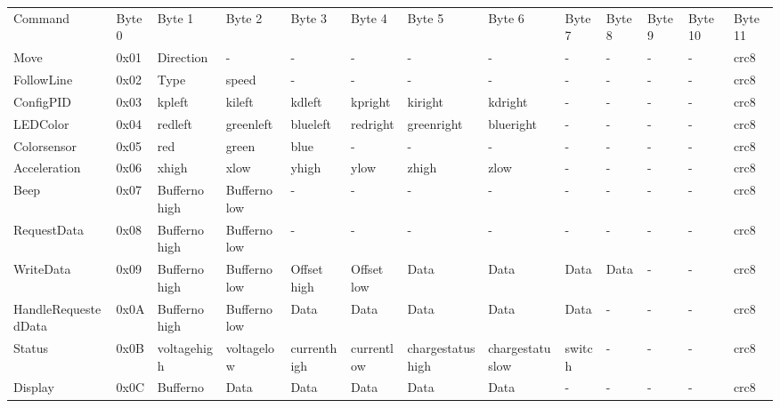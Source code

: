 \begin{landscape}
\begin{footnotesize}
\begin{tabular}{lllllllllllll}
Command &
    Byte 0 &
    Byte 1 &
    Byte 2 &
    Byte 3 &
    Byte 4 &
    Byte 5 &
    Byte 6 &
    Byte 7 &
    Byte 8 &
    Byte 9 &
    Byte 10 &
    Byte 11 \\
Move &
    0x01 &
    Direction &
    - &
    - &
    - &
    - &
    - &
    - &
    - &
    - &
    - &
    crc8 \\
FollowLine &
    0x02 &
    Type &
    speed &
    - &
    - &
    - &
    - &
    - &
    - &
    - &
    - &
    crc8 \\
ConfigPID &
    0x03 &
    kpleft &
    kileft &
    kdleft &
    kpright &
    kiright &
    kdright &
    - &
    - &
    - &
    - &
    crc8 \\
LEDColor &
    0x04 &
    redleft &
    greenleft &
    blueleft &
    redright &
    greenright &
    blueright &
    - &
    - &
    - &
    - &
    crc8 \\
Colorsensor &
    0x05 &
    red &
    green &
    blue &
    - &
    - &
    - &
    - &
    - &
    - &
    - &
    crc8 \\
Acceleration &
    0x06 &
    xhigh &
    xlow &
    yhigh &
    ylow &
    zhigh &
    zlow &
    - &
    - &
    - &
    - &
    crc8 \\
Beep &
    0x07 &
    Bufferno high &
    Bufferno low &
    - &
    - &
    - &
    - &
    - &
    - &
    - &
    - &
    crc8 \\
RequestData &
    0x08 &
    Bufferno high &
    Bufferno low &
    - &
    - &
    - &
    - &
    - &
    - &
    - &
    - &
    crc8 \\
WriteData &
    0x09 &
    Bufferno high &
    Bufferno low &
    Offset high &
    Offset low &
    Data &
    Data &
    Data &
    Data &
    - &
    - &
    crc8 \\
HandleRequestedData &
    0x0A &
    Bufferno high &
    Bufferno low &
    Data &
    Data &
    Data &
    Data &
    Data &
    - &
    - &
    - &
    crc8 \\
Status &
    0x0B &
    voltagehigh &
    voltagelow &
    currenthigh &
    currentlow &
    chargestatushigh &
    chargestatuslow &
    switch &
    - &
    - &
    - &
    crc8 \\
Display &
    0x0C &
    Bufferno &
    Data &
    Data &
    Data &
    Data &
    Data &
    - &
    - &
    - &
    - &
    crc8 \\

\end{tabular}
\end{footnotesize}
\end{landscape}
